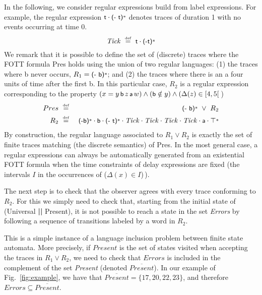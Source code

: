 \documentclass[a4paper]{scrartcl}
\def\code#1{\textsf{\small\bfseries #1}}
\def\vars#1{\textsf{\small #1}}
\newcommand{\eqdef}{\ensuremath{\overset{\text{\tiny def}}{=}}}
\newcommand{\tick}{\ensuremath{\mathit{Tick}}}
\newcommand{\kleene}{\ensuremath{\mathclose{\overset{*}{\ }}}}
\begin{document}
In the following, we consider regular expressions build from label
expressions. For example, the regular expression
$\vars{t} \cdot \text{\vars{(- t)}}\kleene $ denotes traces of
duration 1 with no events occurring at time $0$.
\begin{equation}
  \tick \ \eqdef\  \vars{t} \cdot
  \text{\vars{(-t)}}\kleene\label{eq:1}
\end{equation}
We remark that it is possible to define the set of (discrete) traces
where the FOTT formula {Pres} holds using the union of two regular
languages: (1) the traces where \vars{b} never occurs, $R_1 =
\text{\vars{(- b)}}\kleene$; and (2) the traces where there is an
\vars{a} four units of time after the first \vars{b}. In this
particular case, $R_2$ is a regular expression corresponding to the
property $(x = y \, \vars{b} \, z \, \vars{a}\, w) \wedge (\vars{b}
\notin y) \wedge (\Delta(z) \in [4,5[$\,)
\begin{eqnarray}
  Pres &\ \eqdef\ & \text{\vars{(- b)}}\kleene \ \vee\ R_2\\
  R_2 &\ \eqdef\ & \text{\vars{(-b)}}\kleene \cdot \vars{b} \cdot
  \text{\vars{(- t)}}\kleene \cdot \tick \cdot \tick \cdot \tick \cdot
  \tick \cdot \vars{a} \cdot \top\kleene\label{eqn:R2}
\end{eqnarray}
By construction, the regular language associated to $R_1 \vee R_2$ is
exactly the set of finite traces matching (the discrete semantics) of
Pres.  In the most general case, a regular expressions can always be
automatically generated from an existential FOTT formula when the time
constraints of delay expressions are fixed (the intervals $I$ in the
occurrences of ($\Delta(x) \in I$)\,).

The next step is to check that the observer agrees with every trace
conforming to $R_2$. For this we simply need to check that, starting
from the initial state of (\vars{Universal} \code{||} \vars{Present}),
it is not possible to reach a state in the set \emph{Errors} by
following a sequence of transitions labeled by a word in $R_2$. 

This is a simple instance of a language inclusion problem between
finite state automata. More precisely, if $\mathit{Present}$ is the
set of states visited when accepting the traces in $R_1 \vee R_2$, we
need to check that $\mathit{Errors}$ is included in the complement of
the set \emph{Present} (denoted $\overline{\mathit{Present}}$). In our
example of Fig.~\ref{fig:example}, we have that
$\overline{\mathit{Present}}= \{17, 20, 22, 23\}$, and therefore
$\mathit{Errors} \subseteq \overline{\mathit{Present}}$.
\end{document}
